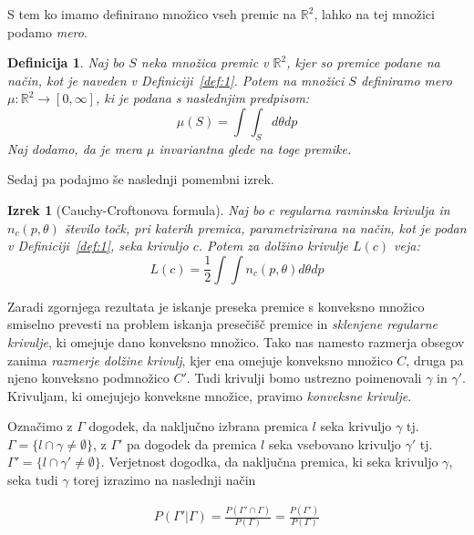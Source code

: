 \documentclass[a4paper]{article}
\newtheorem{definicija}{Definicija}
\newtheorem{izrek}{Izrek}
\begin{document}
\vspace{3 mm}

S tem ko imamo definirano množico vseh premic na $\mathbb{R}^2$, lahko na tej množici podamo \textit{mero}.

\begin{definicija}
Naj bo $S$ neka množica premic v $\mathbb{R}^2$, kjer so premice podane na način, kot je naveden v Definiciji~\ref{def:1}. Potem na množici $S$ definiramo mero $\mu : \mathbb{R}^2 \rightarrow [0, \infty ]$, ki je podana s naslednjim predpisom: $$ \mu(S) =  \int \int_S  d\theta dp$$Naj dodamo, da je mera $\mu$ invariantna glede na toge premike. 
\end{definicija}

Sedaj pa podajmo še naslednji pomembni izrek.

\begin{izrek}[Cauchy-Croftonova formula]\label{izrek:1}
 Naj bo $c$ regularna ravninska krivulja in $n_c (p, \theta)$  število točk, pri katerih premica, parametrizirana na način, kot je podan v Definiciji~\ref{def:1}, seka krivuljo $c$. Potem za dolžino krivulje $L(c)$ veja: $$L(c) = \frac{1}{2}\int \int n_c (p, \theta) d\theta dp $$ 
 \end{izrek}

\vspace{3 mm}

Zaradi zgornjega rezultata je iskanje preseka premice s konveksno množico smiselno prevesti na problem iskanja presečišč premice in \textit{sklenjene regularne krivulje}, ki omejuje dano konveksno množico. Tako nas namesto razmerja obsegov zanima \textit{razmerje dolžine krivulj}, kjer ena omejuje konveksno množico $C$, druga pa njeno konveksno podmnožico $C'$. Tudi krivulji bomo ustrezno poimenovali $\gamma$ in $\gamma '$. Krivuljam, ki omejujejo konveksne množice, pravimo \textit{konveksne krivulje}. 

Označimo z $\Gamma$ dogodek, da naključno izbrana premica $l$ seka krivuljo $\gamma$ tj. $\Gamma = \{l \cap \gamma \ne  \emptyset \}$, z $\Gamma'$ pa dogodek da premica $l$ seka vsebovano krivuljo $\gamma'$  tj. $\Gamma' = \{l \cap \gamma' \ne  \emptyset \}$.  Verjetnost dogodka, da naključna premica, ki seka krivuljo $\gamma$, seka tudi $\gamma$ torej izrazimo na naslednji način

\begin{align}
P(\Gamma' | \Gamma) = \frac{P( \Gamma' \cap  \Gamma)}{P( \Gamma)} = \frac{P( \Gamma')}{P( \Gamma)} \label{eq1}
\end{align}
\end{document}
